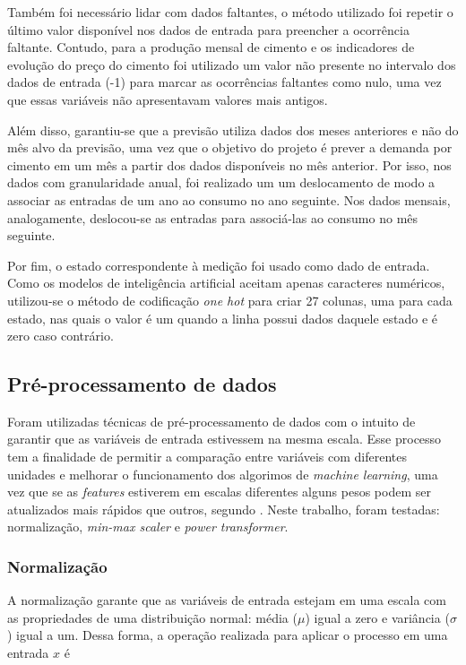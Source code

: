 Também foi necessário lidar com dados faltantes, o método utilizado foi
repetir o último valor disponível nos dados de entrada para
preencher a ocorrência faltante. Contudo, para a produção mensal de cimento e os 
indicadores de evolução do preço do cimento foi utilizado um valor não 
presente no intervalo dos dados de entrada (-1) para marcar as ocorrências 
faltantes como nulo, uma vez que essas variáveis não apresentavam 
valores mais antigos.

Além disso, garantiu-se que a previsão
 utiliza dados dos meses anteriores e não do mês alvo da
previsão, uma vez que o objetivo do projeto é prever a demanda
por cimento em um mês a partir dos dados disponíveis no mês anterior.
Por isso, nos dados com granularidade anual, foi realizado um um 
deslocamento de modo a associar as entradas de um ano ao consumo no 
ano seguinte. Nos dados mensais, analogamente, deslocou-se as entradas 
para associá-las ao consumo no mês seguinte.

Por fim, o estado correspondente à medição foi usado como dado de entrada. 
Como os modelos de inteligência artificial aceitam apenas caracteres numéricos,
utilizou-se o método de codificação \textit{one hot} para criar 27 colunas, uma
para cada estado, nas quais o valor é um quando a linha possui dados daquele estado 
e é zero caso contrário.


\subsection{Pré-processamento de dados}
\label{sec:norm_dados}

Foram utilizadas técnicas de pré-processamento de dados 
com o intuito de garantir que as variáveis de entrada 
estivessem na mesma escala. Esse processo tem a finalidade de permitir a comparação 
entre variáveis com diferentes unidades e melhorar o funcionamento dos 
algorimos de \textit{machine learning}, uma vez que se as \textit{features} estiverem em escalas diferentes
alguns pesos podem ser atualizados mais rápidos que outros, segundo \citet{Raschka}.
Neste trabalho, foram testadas: normalização, 
\textit{min-max scaler} e \textit{power transformer}.

\subsubsection{Normalização}

A normalização garante que as variáveis de entrada estejam em uma 
escala com as propriedades de uma distribuição normal: média ($\mu$)
igual a zero e variância ($\sigma$) igual a um. Dessa forma, a operação 
realizada para aplicar o processo em uma entrada $x$ é

